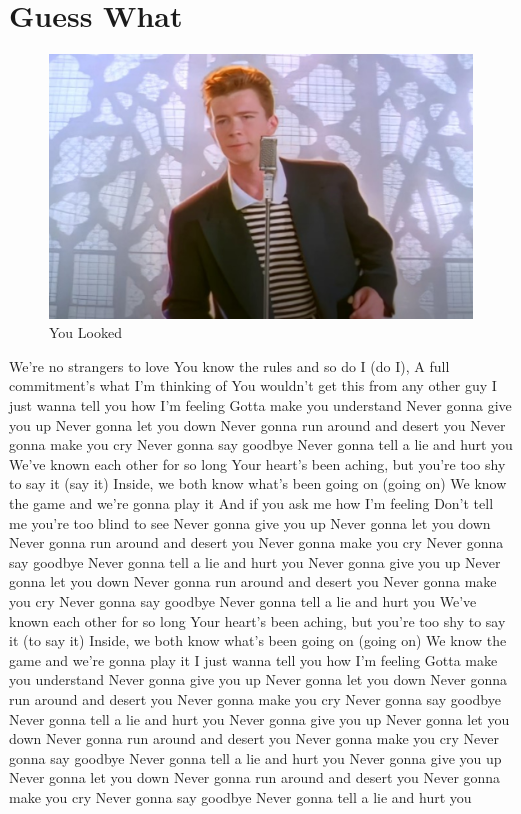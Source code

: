 \section{Guess What} \label{T1}

\begin{figure}
\centering
\includegraphics[width=1\linewidth]{Resources/NGGYU.jpg}
\caption{ You Looked}
\label{fig:ParticlePic}
\end{figure}

We're no strangers to love
You know the rules and so do I (do I), 
A full commitment's what I'm thinking of
You wouldn't get this from any other guy
I just wanna tell you how I'm feeling
Gotta make you understand
Never gonna give you up
Never gonna let you down
Never gonna run around and desert you
Never gonna make you cry
Never gonna say goodbye
Never gonna tell a lie and hurt you
We've known each other for so long
Your heart's been aching, but you're too shy to say it (say it)
Inside, we both know what's been going on (going on)
We know the game and we're gonna play it
And if you ask me how I'm feeling
Don't tell me you're too blind to see
Never gonna give you up
Never gonna let you down
Never gonna run around and desert you
Never gonna make you cry
Never gonna say goodbye
Never gonna tell a lie and hurt you
Never gonna give you up
Never gonna let you down
Never gonna run around and desert you
Never gonna make you cry
Never gonna say goodbye
Never gonna tell a lie and hurt you
We've known each other for so long
Your heart's been aching, but you're too shy to say it (to say it)
Inside, we both know what's been going on (going on)
We know the game and we're gonna play it
I just wanna tell you how I'm feeling
Gotta make you understand
Never gonna give you up
Never gonna let you down
Never gonna run around and desert you
Never gonna make you cry
Never gonna say goodbye
Never gonna tell a lie and hurt you
Never gonna give you up
Never gonna let you down
Never gonna run around and desert you
Never gonna make you cry
Never gonna say goodbye
Never gonna tell a lie and hurt you
Never gonna give you up
Never gonna let you down
Never gonna run around and desert you
Never gonna make you cry
Never gonna say goodbye
Never gonna tell a lie and hurt you
\parencite{astleynever}